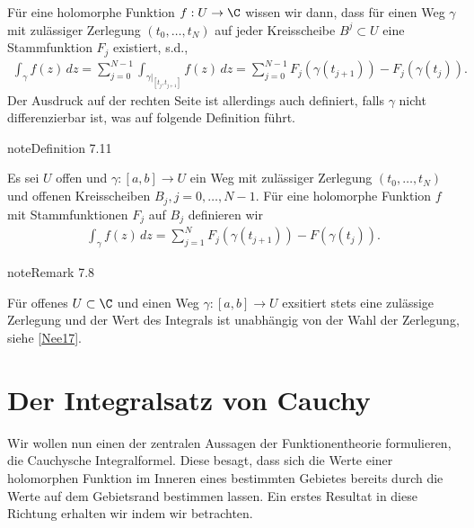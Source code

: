 \documentclass[letterpaper,10pt,german]{jupyterBook}
\begin{document}
\sphinxAtStartPar
Für eine holomorphe Funktion \(f:U\to\C\) wissen wir dann, dass für einen Weg \(\gamma\) mit zulässiger Zerlegung \((t_0,\ldots,t_N)\) auf jeder Kreisscheibe \(B^j\subset U\) eine Stammfunktion \(F_j\) existiert, s.d.,
\begin{equation*}
\begin{split}\int_\gamma f(z)\, dz= \sum_{j=0}^{N-1} \int_{\gamma\rvert_[t_j,t_{j+1}]} f(z)\, dz=
\sum_{j=0}^{N-1} F_j(\gamma(t_{j+1})) - F_j(\gamma(t_{j})).\end{split}
\end{equation*}
\sphinxAtStartPar
Der Ausdruck auf der rechten Seite ist allerdings auch definiert, falls \(\gamma\) nicht differenzierbar ist, was auf folgende Definition führt.
\label{complexanalysis/kurvenintegrale:definition-19}
\begin{sphinxadmonition}{note}{Definition 7.11}



\sphinxAtStartPar
Es sei \(U\) offen und \(\gamma:[a,b]\to U\) ein Weg mit zulässiger Zerlegung \((t_0,\ldots,t_N)\) und offenen Kreisscheiben \(B_j,j=0,\ldots,N-1\). Für eine holomorphe Funktion \(f\) mit Stammfunktionen \(F_j\) auf \(B_j\) definieren wir
\begin{equation*}
\begin{split}\int_\gamma f(z)\, dz = \sum_{j=1}^N F_j(\gamma(t_{j+1}))- F(\gamma(t_j)).\end{split}
\end{equation*}\end{sphinxadmonition}
\label{complexanalysis/kurvenintegrale:remark-20}
\begin{sphinxadmonition}{note}{Remark 7.8}



\sphinxAtStartPar
Für offenes \(U\subset\C\) und einen Weg \(\gamma:[a,b]\to U\) exsitiert stets eine zulässige Zerlegung und der Wert des Integrals ist unabhängig von der Wahl der Zerlegung, siehe {[}\hyperlink{cite.references:id13}{Nee17}{]}.
\end{sphinxadmonition}


\section{Der Integralsatz von Cauchy}
\label{\detokenize{complexanalysis/cauchyintegral:der-integralsatz-von-cauchy}}\label{\detokenize{complexanalysis/cauchyintegral::doc}}
\sphinxAtStartPar
Wir wollen nun einen der zentralen Aussagen der Funktionentheorie formulieren, die Cauchysche Integralformel.
Diese besagt, dass sich die Werte einer holomorphen Funktion im Inneren eines bestimmten Gebietes bereits durch die Werte auf dem Gebietsrand bestimmen lassen. Ein erstes Resultat in diese Richtung erhalten wir indem wir  betrachten.
\end{document}
